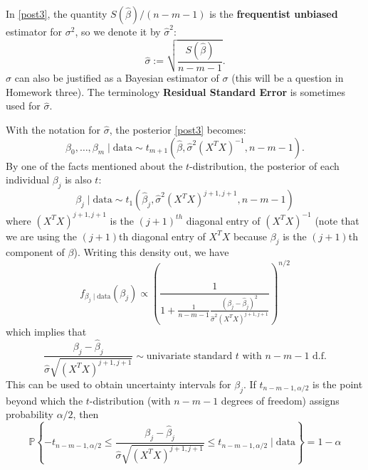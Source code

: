 \documentclass{scrartcl}
\renewcommand{\P}{{\mathbb P}}
\begin{document}
In \eqref{post3}, the quantity
$S(\hat{\beta})/(n-m-1)$ is the \textbf{frequentist 
  unbiased} estimator for $\sigma^2$, so we denote it by
$\hat{\sigma}^2$:
\begin{equation*}
  \hat{\sigma} := \sqrt{\frac{S(\hat{\beta})}{n-m-1}}. 
\end{equation*}
$\hat{\sigma}$ can also be justified as a Bayesian estimator of
$\sigma$ (this will be a question in Homework three). The terminology
\textbf{Residual Standard Error} is sometimes used for
$\hat{\sigma}$. 

With the notation for $\hat{\sigma}$, the posterior \eqref{post3}
becomes:
\begin{equation}\label{post4}
  \beta_0, \dots, \beta_m \mid \text{data} \sim
  t_{m+1}\left(\hat{\beta},\hat{\sigma}^2 \left(X^T
      X 
  \right)^{-1}, n - m - 1 \right). 
\end{equation}
By one of the facts mentioned about the $t$-distribution, the
posterior of each individual $\beta_j$ is also $t$:  
  \begin{equation}\label{marg4}
    \beta_j \mid \text{data} \sim t_{1}\left(\hat{\beta}_j,
\hat{\sigma}^2 (X^T X)^{j+1, j+1}, n-m-1 \right) 
  \end{equation}
  where $(X^T X)^{j+1, j+1}$ is the $(j+1)^{th}$ diagonal entry 
  of $(X^T X)^{-1}$ (note that we are using the $(j+1)$th diagonal
  entry of $X^TX$ because $\beta_j$ is the $(j+1)$th component of
  $\beta$). Writing this density out, we have
  \begin{equation*}
    f_{\beta_j \mid \text{data}}(\beta_j) \propto \left(\frac{1}{1 +
        \frac{1}{n-m-1} \frac{(\beta_j -
          \hat{\beta}_j)^2}{\hat{\sigma}^2 (X^TX)^{j+1,
            j+1}}}  \right)^{n/2} 
  \end{equation*}
  which implies that
  \begin{equation*}
    \frac{\beta_j - \hat{\beta}_j}{\hat{\sigma} \sqrt{(X^T X)^{j+1,
          j+1}}} \sim \text{univariate standard } t \text{ with }
    n-m-1 \text{ d.f.}
  \end{equation*}
  This can be used to obtain uncertainty intervals for $\beta_j$. If
  $t_{n-m-1, \alpha/2}$ is the point beyond which the $t$-distribution
  (with $n-m-1$ degrees of freedom) assigns probability $\alpha/2$,
  then
  \begin{equation*}
    \P \left\{-t_{n-m-1, \alpha/2} \leq     \frac{\beta_j - \hat{\beta}_j}{\hat{\sigma} \sqrt{(X^T X)^{j+1,
          j+1}}} \leq t_{n-m-1, \alpha/2} \mid \text{data} \right\} =
  1 - \alpha
\end{equation*}
\end{document}
